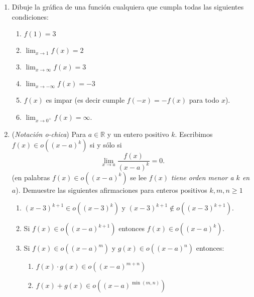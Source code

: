 \documentclass[12pt, a4paper]{article}
\begin{document}
\begin{enumerate}
\item Dibuje la gráfica de una función cualquiera que cumpla todas las siguientes condiciones:
\begin{enumerate}
\item $f(1)=3$
\item $\lim_{x\rightarrow 1} f(x)=2$
\item $\lim_{x\rightarrow \infty} f(x)=3$
\item $\lim_{x\rightarrow -\infty} f(x)=-3$
\item $f(x)$ es impar (es decir cumple $f(-x)=-f(x)$ para todo $x$).
\item $\lim_{x\rightarrow 0^{+}} f(x)=\infty$.
\end{enumerate}

\item (\emph{Notación o-chica}) Para $a\in \mathbb{R}$ y un entero positivo $k$. Escribimos $f(x)\in o\left((x-a)^k\right)$ si y sólo si 
\[\lim_{x\rightarrow a} \frac{f(x)}{(x-a)^k} = 0.\]
(en palabras $f(x)\in o\left((x-a)^k\right)$ se lee \emph{ $f(x)$ tiene orden menor a $k$ en $a$}).
Demuestre las siguientes afirmaciones para enteros positivos $k,m,n\geq 1$

\begin{enumerate}
\item  $(x-3)^{k+1}\in o((x-3)^{k})$ y $(x-3)^{k+1}\not\in o((x-3)^{k+1})$. 
\item  Si $f(x)\in o\left((x-a)^{k+1}\right)$ entonces $f(x)\in o\left((x-a)^{k}\right)$.
\item Si $f(x)\in o\left((x-a)^{m}\right)$ y $g(x)\in o\left((x-a)^{n}\right)$ entonces:
\begin{enumerate}
\item $f(x)\cdot g(x)\in o\left((x-a)^{m+n}\right)$

\item $f(x)+ g(x)\in o\left((x-a)^{\min(m,n)}\right)$
\end{enumerate}

\end{enumerate}


\end{enumerate}
\end{document}

